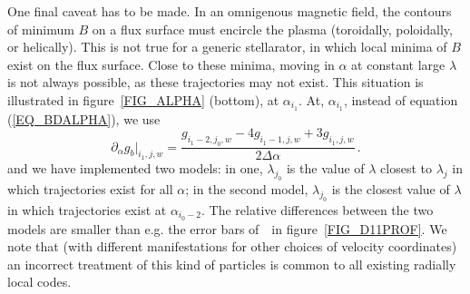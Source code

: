 One final caveat has to be made. In an omnigenous magnetic field, the contours of minimum $B$ on a flux surface must encircle the plasma (toroidally, poloidally, or helically). This is not true for a generic stellarator, in which local minima of $B$ exist on the flux surface. Close to these minima, moving in $\alpha$ at constant large $\lambda$ is not always possible, as these trajectories may not exist. This situation is illustrated in figure~\ref{FIG_ALPHA} (bottom), at $\alpha_{i_1}$. At, $\alpha_{i_1}$, instead of equation (\ref{EQ_BDALPHA}), we use
 \begin{equation}
\partial_\alpha g_b|_{i_1,j,w}=\frac{g_{i_1-2,j_0,w}-4g_{i_1-1,j,w}+3g_{i_1,j,w}}{2\Delta\alpha}\,.\label{EQ_NOALPHA}
\end{equation}
and we have implemented two models: in one, $\lambda_{j_0}$ is the value of $\lambda$ closest to $\lambda_j$ in which trajectories exist for all $\alpha$; in the second model, $\lambda_{j_0}$ is the closest value of $\lambda$ in which trajectories exist at $\alpha_{i_0-2}$. The relative differences between the two models are smaller than e.g. the error bars of~\DKES~in figure~\ref{FIG_D11PROF}. We note that (with different manifestations for other choices of velocity coordinates) an incorrect treatment of this kind of particles is common to all existing radially local codes.
%
%
%
%
%


